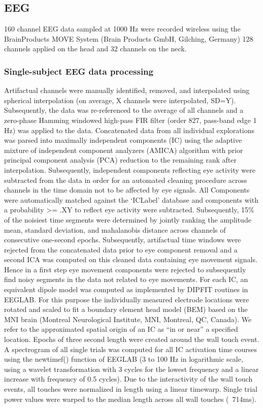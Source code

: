 \subsection{EEG}
160 channel EEG data sampled at 1000 Hz were recorded wireless using the BrainProducts MOVE System (Brain Products GmbH, Gilching, Germany) 128 channels applied on the head and 32 channels on the neck.

\subsubsection{Single-subject EEG data processing}
Artifactual channels were manually identified, removed, and interpolated using spherical interpolation (on average, X channels were interpolated, SD=Y). Subsequently, the data was re-referenced to the average of all channels and a zero-phase Hamming windowed high-pass FIR filter (order 827, pass-band edge 1 Hz) was applied to the data. Concatenated data from all individual explorations was parsed into maximally independent components (IC) using the adaptive mixture of independent component analyzers (AMICA) algorithm with prior principal component analysis (PCA) reduction to the remaining rank after interpolation\citep{Palmer2011}. Subsequently, independent components reflecting eye activity were subtracted from the data in order for an automated cleaning procedure across channels in the time domain not to be affected by eye signals. All Components were automatically matched against the ‘ICLabel’ database and components with a probability >= .XY to reflect eye activity were subtracted\citep{iclabel}. Subsequently, 15\% of the noisiest time segments were determined by jointly ranking the amplitude mean, standard deviation, and mahalanobis distance across channels of consecutive one-second epochs\citep{cleaning_fh2018}. Subsequently, artifactual time windows were rejected from the concatenated data prior to eye component removal and a second ICA was computed on this cleaned data containing eye movement signals. Hence in a first step eye movement components were rejected to subsequently find noisy segments in the data not related to eye movements.
For each IC, an equivalent dipole model was computed as implemented by DIPFIT routines in EEGLAB. For this purpose the individually measured electrode locations were rotated and scaled to fit a boundary element head model (BEM) based on the MNI brain (Montreal Neurological Institute, MNI, Montreal, QC, Canada). We refer to the approximated spatial origin of an IC as “in or near” a specified location.
Epochs of three second length were created around the wall touch event. A spectrogram of all single trials was computed for all IC activation time courses using the newtimef() function of EEGLAB (3 to 100 Hz in logarithmic scale, using a wavelet transformation with 3 cycles for the lowest frequency and a linear increase with frequency of 0.5 cycles).
Due to the interactivity of the wall touch events, all touches were normalized in length using a linear timewarp. Single trial power values were warped to the median length across all wall touches (~714ms).

